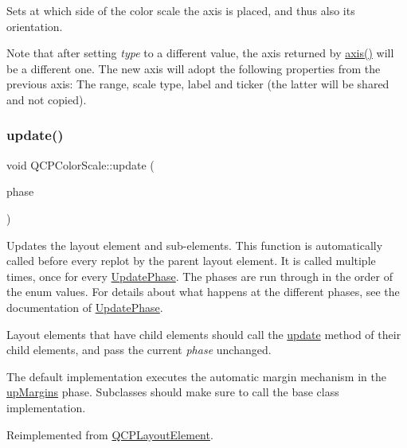 Sets at which side of the color scale the axis is placed, and thus also its orientation.

Note that after setting {\itshape type} to a different value, the axis returned by \hyperlink{classQCPColorScale_a39bdbdb3b212602a5a57f9f3ea444190}{axis()} will be a different one. The new axis will adopt the following properties from the previous axis\+: The range, scale type, label and ticker (the latter will be shared and not copied). \mbox{\label{classQCPColorScale_a259dcb6d3053a2cc3c197e9b1191ddbe}} 
\subsubsection{\texorpdfstring{update()}{update()}}
{\footnotesize\ttfamily void Q\+C\+P\+Color\+Scale\+::update (\begin{DoxyParamCaption}\item[{\hyperlink{classQCPLayoutElement_a0d83360e05735735aaf6d7983c56374d}{Update\+Phase}}]{phase }\end{DoxyParamCaption})\hspace{0.3cm}{\ttfamily [virtual]}}

Updates the layout element and sub-\/elements. This function is automatically called before every replot by the parent layout element. It is called multiple times, once for every \hyperlink{classQCPLayoutElement_a0d83360e05735735aaf6d7983c56374d}{Update\+Phase}. The phases are run through in the order of the enum values. For details about what happens at the different phases, see the documentation of \hyperlink{classQCPLayoutElement_a0d83360e05735735aaf6d7983c56374d}{Update\+Phase}.

Layout elements that have child elements should call the \hyperlink{classQCPColorScale_a259dcb6d3053a2cc3c197e9b1191ddbe}{update} method of their child elements, and pass the current {\itshape phase} unchanged.

The default implementation executes the automatic margin mechanism in the \hyperlink{classQCPLayoutElement_a0d83360e05735735aaf6d7983c56374da288cb59a92280e47261a341f2813e676}{up\+Margins} phase. Subclasses should make sure to call the base class implementation. 

Reimplemented from \hyperlink{classQCPLayoutElement_a929c2ec62e0e0e1d8418eaa802e2af9b}{Q\+C\+P\+Layout\+Element}.

